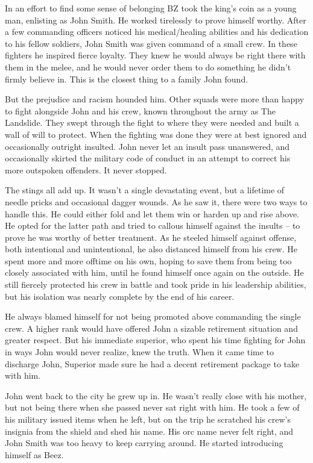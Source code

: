 In an effort to find some sense of belonging BZ took the king’s coin as a young man, enlisting as John Smith. He worked tirelessly to prove himself worthy. After a few commanding officers noticed his medical/healing abilities and his dedication to his fellow soldiers, John Smith was given command of a small crew. In these fighters he inspired fierce loyalty. They knew he would always be right there with them in the melee, and he would never order them to do something he didn’t firmly believe in. This is the closest thing to a family John found.

But the prejudice and racism hounded him. Other squads were more than happy to fight alongside John and his crew, known throughout the army as The Landslide. They swept through the fight to where they were needed and built a wall of will to protect. When the fighting was done they were at best ignored and occasionally outright insulted. John never let an insult pass unanswered, and occasionally skirted the military code of conduct in an attempt to correct his more outspoken offenders. It never stopped.

The stings all add up. It wasn’t a single devastating event, but a lifetime of needle pricks and occasional dagger wounds. As he saw it, there were two ways to handle this. He could either fold and let them win or harden up and rise above. He opted for the latter path and tried to callous himself against the insults -- to prove he was worthy of better treatment. As he steeled himself against offense, both intentional and unintentional, he also distanced himself from his crew. He spent more and more offtime on his own, hoping to save them from being too closely associated with him, until he found himself once again on the outside. He still fiercely protected his crew in battle and took pride in his leadership abilities, but his isolation was nearly complete by the end of his career.

He always blamed himself for not being promoted above commanding the single crew. A higher rank would have offered John a sizable retirement situation and greater respect. But his immediate superior, who spent his time fighting for John in ways John would never realize, knew the truth. When it came time to discharge John, Superior made sure he had a decent retirement package to take with him.

John went back to the city he grew up in. He wasn’t really close with his mother, but not being there when she passed never sat right with him. He took a few of his military issued items when he left, but on the trip he scratched his crew’s insignia from the shield and shed his name. His orc name never felt right, and John Smith was too heavy to keep carrying around. He started introducing himself as Beez.

